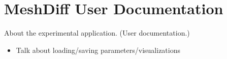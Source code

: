 \chapter{MeshDiff User Documentation}

About the experimental application. (User documentation.)

\begin{itemize}
\item Talk about loading/saving parameters/visualizations
\end{itemize}